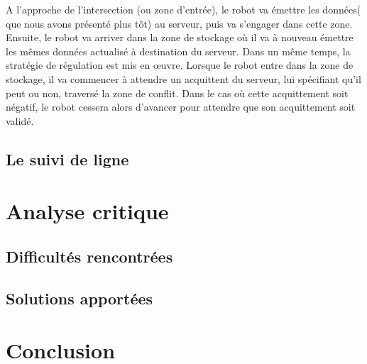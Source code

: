 \documentclass[french,a4paper,12pt]{report}
\begin{document}
A l'approche de l'intersection (ou zone d'entrée), le robot va émettre les données( que nous avons présenté plus tôt) au serveur, puis va s'engager dans cette zone.
Ensuite, le robot va arriver dans la zone de stockage où il va à nouveau émettre les mêmes données actualisé à destination du serveur. Dans un même temps, la stratégie de régulation est mis en œuvre. Lorsque le robot entre dans la zone de stockage, il va commencer à attendre un acquittent du serveur, lui spécifiant qu'il peut ou non, traversé la zone de conflit. Dans le cas où cette acquittement soit négatif, le robot cessera alors d'avancer pour attendre que son acquittement soit validé.




\chapter{Le suivi de ligne} %

\part{Analyse critique}

\chapter{Difficultés rencontrées}

\chapter{Solutions apportées}

\part{Conclusion}
\end{document}

